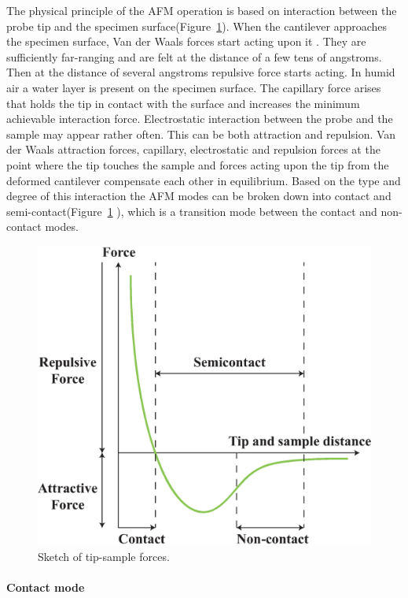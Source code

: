 The physical principle of the AFM operation is based on interaction between the probe tip and the specimen surface(Figure~\ref{fig:afm3}). When the cantilever approaches the specimen surface, Van der Waals forces start acting upon it . They are sufficiently far-ranging and are felt at the distance of a few tens of angstroms. Then at the distance of several angstroms repulsive force starts acting. In humid air a water layer is present on the specimen surface. The capillary force arises that holds the tip in contact with the surface and increases the minimum achievable interaction force. Electrostatic interaction between the probe and the sample may appear rather often. This can be both attraction and repulsion. Van der Waals attraction forces, capillary, electrostatic and repulsion forces at the point where the tip touches the sample and forces acting upon the tip from the deformed cantilever compensate each other in equilibrium. Based on the type and degree of this interaction the AFM modes can be broken down into contact and semi-contact(Figure~\ref{fig:afm3} ), which is a transition mode between the contact and non-contact modes.
\begin{figure}[htb]
\centering
\includegraphics[scale=0.6]{figures/afm3.eps}
\caption{\label{fig:afm3}Sketch of tip-sample forces.}
\end{figure}

\paragraph{Contact mode}


